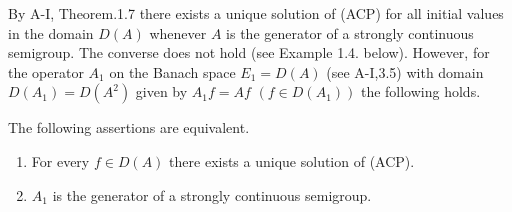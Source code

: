 By A-I, Theorem.1.7 there exists a unique solution of (ACP) for all initial values in the domain $D(A)$ whenever $A$ is the generator of a strongly continuous semigroup.
The converse does not hold (see Example 1.4. below).
However, for the operator $A_{1}$ on the Banach space $E_{1} = D(A)$ (see A-I,3.5) with domain 
$D(A_{1}) = D(A^{2})$ given by $A_{1}f = Af$ $(f \in D(A_{1}))$ the following holds.
\begin{theorem}\label{thm:a2-1.1}
The following assertions are equivalent.
\begin{enumerate}[\upshape (a)]

\item \label{thm:a2-1.1-1}
For every $f \in D(A)$ there exists a unique solution of (ACP).

\item \label{thm:a2-1.1-2}
$A_{1}$ is the generator of a strongly continuous semigroup.
\end{enumerate}
\end{theorem}
